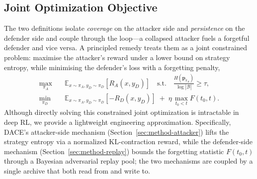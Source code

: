 \documentclass{article}
\newcommand{\method}{\textsc{DACE}\xspace}
\newcommand{\piA}{\pi_A}
\newcommand{\piD}{\pi_D}
\newcommand{\strategyspace}{\mathcal{B}}
\begin{document}
\subsection{Joint Optimization Objective}

The two definitions isolate \emph{coverage} on the attacker side and \emph{persistence} on the defender side and couple through the loop---a collapsed attacker fuels a forgetful defender and vice versa. A principled remedy treats them as a joint constrained problem: maximise the attacker's reward under a lower bound on strategy entropy, while minimising the defender's loss with a forgetting penalty,
\begin{align}
  \max_{\piA} \quad & \mathbb{E}_{x\sim\piA, y_D\sim\piD} [R_A(x, y_D)] \quad \text{s.t.} \quad \frac{H(\mathbf{p}_{\piA})}{\log|\strategyspace|} \ge \tau, \label{eq:obj-attacker}\\
  \min_{\piD} \quad & \mathbb{E}_{x\sim\piA, y_D\sim\piD} [-R_D(x, y_D)] \;+\; \eta\,\max_{t_0 < t} F(t_0, t). \label{eq:obj-defender}
\end{align}
Although directly solving this constrained joint optimization is intractable in deep RL, we provide a lightweight engineering approximation. Specifically, \method's attacker-side mechanism (Section~\ref{sec:method-attacker}) lifts the strategy entropy via a normalized KL-contraction reward, while the defender-side mechanism (Section~\ref{sec:method-replay}) bounds the forgetting statistic $F(t_0, t)$ through a Bayesian adversarial replay pool; the two mechanisms are coupled by a single archive that both read from and write to.
\end{document}
